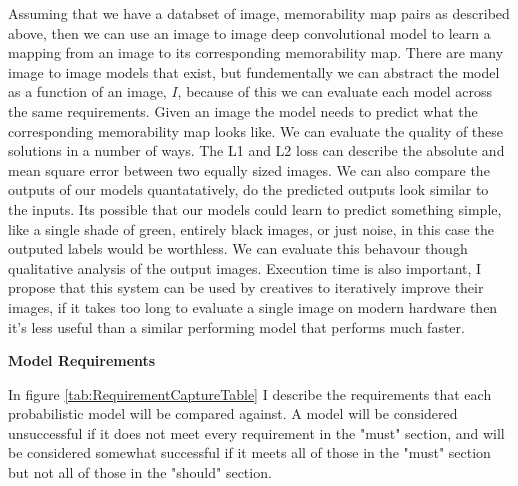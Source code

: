 \documentclass{UoYCSproject}
\begin{document}
Assuming that we have a databset of image, memorability map pairs as described above, then we can use an image to image deep convolutional model to learn a mapping from an image to its corresponding memorability map. 
There are many image to image models that exist, but fundementally we can abstract the model as a function of an image, $I$, because of this we can evaluate each model across the same requirements. 
Given an image the model needs to predict what the corresponding memorability map looks like.
We can evaluate the quality of these solutions in a number of ways. The L1 and L2 loss can describe the absolute and mean square error between two equally sized images. We can also compare the outputs of our models quantatatively, do the predicted outputs look similar to the inputs. Its possible that our models could learn to predict something simple, like a single shade of green, entirely black images, or just noise, in this case the outputed labels would be worthless. We can evaluate this behavour though qualitative analysis of the output images. Execution time is also important, I propose that this system can be used by creatives to iteratively improve their images, if it takes too long to evaluate a single image on modern hardware then it's less useful than a similar performing model that performs much faster.

\textbf{Model Requirements}

In figure \ref{tab:RequirementCaptureTable} I describe the requirements that each probabilistic model will be compared against. A model will be considered unsuccessful if it does not meet every requirement in the "must" section, and will be considered somewhat successful if it meets all of those in the "must" section but not all of those in the "should" section.
\end{document}

